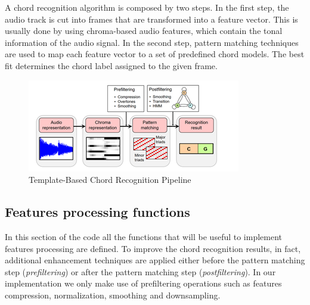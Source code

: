 \documentclass[
	12pt, %
]{fphw}
\begin{document}
A chord recognition algorithm is composed by two steps. In the first step, the audio track is cut into frames that are transformed into a feature vector. This is usually done by using chroma-based audio features, which contain the tonal information of the audio signal.
In the second step, pattern matching techniques are used to map each feature vector to a set of predefined chord models. The best fit determines the chord label assigned to the given frame.

\begin{figure}[H]
 \centering
 \includegraphics[scale=1]{./images/1_template_based_pipeline.png}
 \caption{Template-Based Chord Recognition Pipeline}
\end{figure}


\subsection*{Features processing functions}

In this section of the code all the functions that will be useful to implement features processing are defined. To improve the chord recognition results, in fact, additional enhancement techniques are applied either before the pattern matching step (\emph{prefiltering}) or after the pattern matching step (\emph{postfiltering}). In our implementation we only make use of prefiltering operations such as features compression, normalization, smoothing and downsampling.
\end{document}
